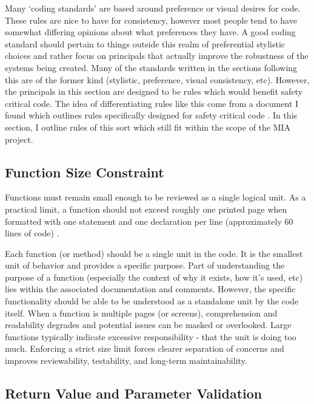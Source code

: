 Many `coding standards' are based around preference or visual desires for code. These rules are nice to have for consistency, however most people tend to have somewhat differing opinions about what preferences they have. A good coding standard should pertain to things outside this realm of preferential stylistic choices and rather focus on principals that actually improve the robustness of the systems being created. Many of the standards written in the sections following this are of the former kind (stylistic, preference, visual consistency, etc). However, the principals in this section are designed to be rules which would benefit safety critical code. The idea of differentiating rules like this come from a document I found which outlines rules specifically designed for safety critical code \cite{Rules_For_Developing_Safety_Critical_Code}. In this section, I outline rules of this sort which still fit within the scope of the MIA project.


\subsection{Function Size Constraint}

Functions must remain small enough to be reviewed as a single logical unit. As a practical limit, a function should not exceed roughly one printed page when formatted with one statement and one declaration per line (approximately 60 lines of code) \cite{Rules_For_Developing_Safety_Critical_Code}.

Each function (or method) should be a single unit in the code. It is the smallest unit of behavior and provides a specific purpose. Part of understanding the purpose of a function (especially the context of why it exists, how it's used, etc) lies within the associated documentation and comments. However, the specific functionality should be able to be understood as a standalone unit by the code itself. When a function is multiple pages (or screens), comprehension and readability degrades and potential issues can be masked or overlooked. Large functions typically indicate excessive responsibility - that the unit is doing too much. Enforcing a strict size limit forces clearer separation of concerns and improves reviewability, testability, and long-term maintainability.



\subsection{Return Value and Parameter Validation}

